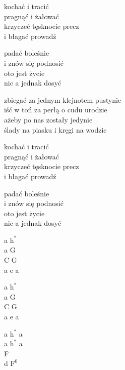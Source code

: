\begin{text}
    kochać i tracić\\
    pragnąć i żałować\\
    krzyczeć tęsknocie precz\\
    i błagać prowadź

    padać boleśnie\\
    i znów się podnosić\\
    oto jest życie\\
    nic a jednak dosyć

    zbiegać za jednym klejnotem pustynie\\
    iść w toń za perłą o cudu urodzie\\
    ażeby po nas zostały jedynie\\
    ślady na piasku i kręgi na wodzie

    kochać i tracić\\
    pragnąć i żałować\\
    krzyczeć tęsknocie precz\\
    i błagać prowadź

    padać boleśnie\\
    i znów się podnosić\\
    oto jest życie\\
    nic a jednak dosyć
\end{text}
\begin{chord}
    a $\mathrm{h^{*}}$\\
    a G\\
    C G\\
    a e a

    a $\mathrm{h^{*}}$\\
    a G\\
    C G\\
    a e a

    a $\mathrm{h^{*}}$ a\\
    a $\mathrm{h^{*}}$ a\\
    F\\
    d $\mathrm{F^{0}}$

    \\
\end{chord}

